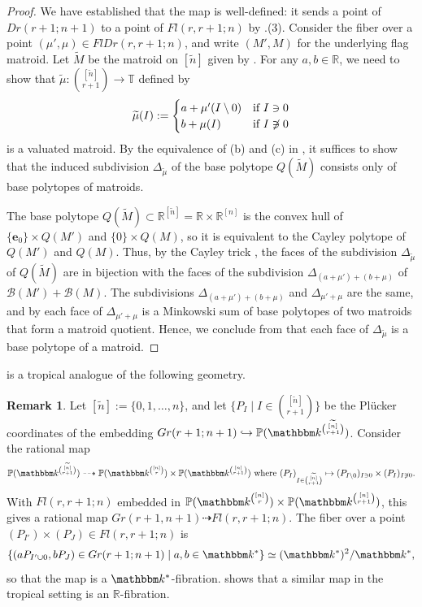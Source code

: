 \documentclass[11pt]{amsart}
\newcommand{\RR}{\mathbb R}
\newcommand{\PP}{\mathbb P}
\newcommand{\TT}{\mathbb T}
\newcommand{\bb}{\mathcal B}
\newcommand{\be}{\mathbf e}
\newcommand{\kk}{\mathbbm k}
\theoremstyle{definition}
\newtheorem{rem}[thm]{Remark}
\begin{document}
\begin{proof}
We have established that the map is well-defined: it sends a point of $Dr(r+1;n+1)$ to a point of $Fl(r,r+1;n)$ by .(3).  Consider the fiber over a point $(\mu',\mu) \in FlDr(r,r+1;n)$, and write $(M',M)$ for the underlying flag matroid.  Let $\widetilde M$ be the matroid on $[\widetilde n]$ given by .  For any $a,b\in \RR$, we need to show that $\widetilde \mu: {[\widetilde n]\choose r+1}\to \TT$ defined by
\[
\widetilde \mu(I) := \begin{cases} a+\mu'(I\setminus 0) & \textnormal{if $I\ni 0$}\\
b+\mu(I) & \textnormal{if $I\not\ni 0$}
\end{cases}
\]
is a valuated matroid.  By the equivalence of (b) and (c) in , it suffices to show that the induced subdivision $\Delta_{\widetilde \mu}$ of the base polytope $Q(\widetilde M)$ consists only of base polytopes of matroids.

The base polytope $Q(\widetilde M)\subset \RR^{[\widetilde n]} = \RR\times \RR^{[n]}$ is the convex hull of $\{\be_0\}\times Q(M')$ and $\{0\} \times Q(M)$, so it is equivalent to the Cayley polytope of $Q(M')$ and $Q(M)$.  Thus, by the Cayley trick \cite[Theorem 9.2.16]{DLRS10}, the faces of the subdivision $\Delta_{\widetilde \mu}$ of $Q(\widetilde M)$ are in bijection with the faces of the subdivision $\Delta_{(a+\mu')+(b+\mu)}$ of $\bb(M') + \bb(M)$.  The subdivisions $\Delta_{(a+\mu')+(b+\mu)}$ and $\Delta_{\mu'+\mu}$ are the same, and by  each face of $\Delta_{\mu'+\mu}$ is a Minkowski sum of base polytopes of two matroids that form a matroid quotient.  Hence, we conclude from  that each face of $\Delta_{\widetilde \mu}$ is a base polytope of a matroid.
\end{proof}

 is a tropical analogue of the following geometry.

\begin{rem}
Let $[\widetilde n] := \{0,1,\ldots, n\}$, and let $\{P_I \mid I\in {[\widetilde n]\choose r+1}\}$ be the Pl\"ucker coordinates of the embedding $Gr(r+1;n+1)\hookrightarrow \PP(\kk^{[\widetilde n]\choose r+1})$. Consider the rational map \[
\PP(\kk^{[\widetilde n]\choose r+1}) \dashrightarrow \PP(\kk^{[n] \choose r}) \times \PP(\kk^{[n]\choose r+1}) \textnormal{ where } (P_I)_{I\in {[\widetilde n]\choose r+1}} \mapsto (P_{I\setminus 0})_{I\ni 0}\times (P_I)_{I\not\ni 0}.
\]
With $Fl(r,r+1;n)$ embedded in $\PP(\kk^{[n] \choose r}) \times \PP(\kk^{[n]\choose r+1})$, this gives a rational map $Gr(r+1,n+1) \dashrightarrow Fl(r,r+1;n)$. 
The fiber over a point $(P_{I'})\times (P_J)\in Fl(r,r+1;n)$ is
\[
\{(aP_{I'\cup 0}, bP_J) \in Gr(r+1;n+1) \mid a,b\in \kk^*\} \simeq (\kk^*)^2/\kk^*,
\]
so that the map is a $\kk^*$-fibration.   shows that a similar map in the tropical setting is an $\RR$-fibration.
\end{rem}
\end{document}
